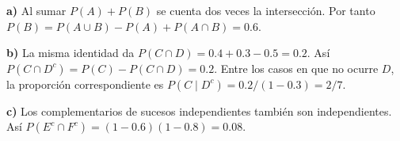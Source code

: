 \textbf{a)} Al sumar $P(A)+P(B)$ se cuenta dos veces la intersección.
Por tanto $P(B)=P(A\cup B)-P(A)+P(A\cap B)=\boxed{0.6}$.

\textbf{b)} La misma identidad da $P(C\cap D)=0.4+0.3-0.5=0.2$.
Así $P(C\cap D^c)=P(C)-P(C\cap D)=0.2$. Entre los casos en que no
ocurre $D$, la proporción correspondiente es
$P(C\mid D^c)=0.2/(1-0.3)=\boxed{2/7}$.

\textbf{c)} Los complementarios de sucesos independientes también son
independientes. Así $P(E^c\cap F^c)=(1-0.6)(1-0.8)=\boxed{0.08}$.
